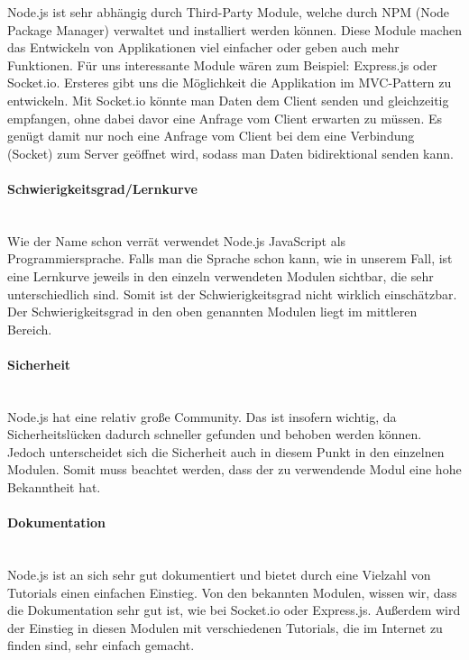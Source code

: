 Node.js ist sehr abh\"angig durch Third-Party Module, welche durch NPM (Node Package Manager) verwaltet und installiert werden k\"onnen. Diese Module machen das Entwickeln von Applikationen viel einfacher oder geben auch mehr Funktionen. F\"ur uns interessante Module w\"aren zum Beispiel: Express.js oder Socket.io. Ersteres gibt uns die M\"oglichkeit die Applikation im MVC-Pattern zu entwickeln.
Mit Socket.io k\"onnte man Daten dem Client senden und gleichzeitig empfangen, ohne dabei davor eine Anfrage vom Client erwarten zu m\"ussen. Es gen\"ugt damit nur noch eine Anfrage vom Client bei dem eine Verbindung (Socket) zum Server ge\"offnet wird, sodass man Daten bidirektional senden kann.

\paragraph{Schwierigkeitsgrad/Lernkurve} \mbox{}\\
Wie der Name schon verr\"at verwendet Node.js JavaScript als Programmiersprache. Falls man die Sprache schon kann, wie in unserem Fall, ist eine Lernkurve jeweils in den einzeln verwendeten Modulen sichtbar, die sehr unterschiedlich sind. Somit ist der Schwierigkeitsgrad nicht wirklich einsch\"atzbar. Der Schwierigkeitsgrad in den oben genannten Modulen liegt im mittleren Bereich.

\paragraph{Sicherheit} \mbox{}\\
Node.js hat eine relativ gro{\ss}e Community. Das ist insofern wichtig, da Sicherheitsl\"ucken dadurch schneller gefunden und behoben werden k\"onnen. Jedoch unterscheidet sich die Sicherheit auch in diesem Punkt in den einzelnen Modulen. Somit muss beachtet werden, dass der zu verwendende Modul eine hohe Bekanntheit hat.

\paragraph{Dokumentation} \mbox{}\\
Node.js ist an sich sehr gut dokumentiert und bietet durch eine Vielzahl von Tutorials einen einfachen Einstieg. Von den bekannten Modulen, wissen wir, dass die Dokumentation sehr gut ist, wie bei Socket.io oder Express.js. Au{\ss}erdem wird der Einstieg in diesen Modulen mit verschiedenen Tutorials, die im Internet zu finden sind, sehr einfach gemacht.

